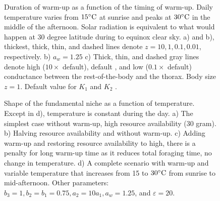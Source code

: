 \vspace{-1.5cm}
%
\begin{figure}[H]
\begin{center}
\caption{
	Duration of warm-up as a function of the timing of warm-up.
	Daily temperature varies from $15^{\circ}\rm{C}$ at sunrise and peaks at $30^{\circ}\rm{C}$ in the middle of the afternoon.
	Solar radiation is equivalent to what would happen at 30 degree latitude during to equinox clear sky.
	a) and b), thickest, thick, thin, and dashed lines denote  $z = 10, 1, 0.1, 0.01$,  respectively.
	b) $a_w = 1.25$
	c) Thick, thin, and dashed gray lines denote high ($10 \times $ default), default , and low ($0.1 \times$ default) conductance between the rest-of-the-body and the thorax. 
	Body size $z = 1$.
	Default value for $K_1$ and $K_2$ .	
}%
\label{fig4}
\end{center}
\end{figure}
\vspace{-1.5cm}
\begin{figure}[H]
\begin{center}
\caption{
	Shape of the fundamental niche as a function of temperature.
	Except in d),  temperature is constant during the day.
	a) The simplest case without warm-up, high resource availability (30 gram).
	b) Halving resource availability and without warm-up.
	c) Adding warm-up and  restoring resource availability to high, there is a penalty for long warm-up time as it reduces total foraging time, no change in temperature.
	d) A complete  scenario with warm-up and variable temperature that increases from 15 to $30^{\circ} \rm{C}$ from sunrise to mid-afternoon.
	Other parameters: $b_3 = 1, b_2 = b_1  = 0.75,  a_2 = 10 a_1, a_w = 1.25$, and  $\varepsilon = 20$.
}%
\label{fig5}
\end{center}
\end{figure}
%